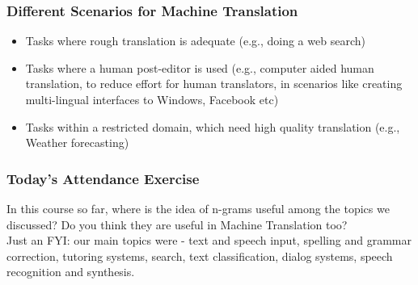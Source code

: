 \documentclass{beamer}
\begin{document}
\begin{frame}
\frametitle{Different Scenarios for Machine Translation}
\begin{itemize}
\item Tasks where rough translation is adequate (e.g., doing a web search)
\item Tasks where a human post-editor is used (e.g., computer aided human translation, to reduce effort for human translators, in scenarios like creating multi-lingual interfaces to Windows, Facebook etc)
\item Tasks within a restricted domain, which need high quality translation (e.g., Weather forecasting)
\end{itemize}
\end{frame}

\begin{frame}
\frametitle{Today's Attendance Exercise}
In this course so far, where is the idea of n-grams useful among the topics we discussed? Do you think they are useful in Machine Translation too? 
\\ Just an FYI: our main topics were - text and speech input, spelling and grammar correction, tutoring systems, search, text classification, dialog systems, speech recognition and synthesis. 
\end{frame}
\end{document}
